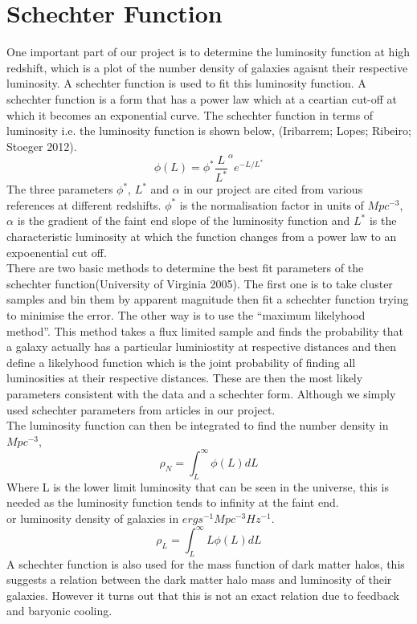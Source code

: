 \documentclass{article}
\begin{document}
\section{Schechter Function}
One important part of our project is to determine the luminosity function at high redshift, which is a plot of the number density of galaxies agaisnt their respective luminosity. A schechter function is used to fit this luminosity function. A schechter function is a form that has a power law which at a ceartian cut-off at which it becomes an exponential curve. The schechter function in terms of luminosity i.e. the luminosity function is shown below, (Iribarrem; Lopes; Ribeiro; Stoeger 2012).
\begin{equation}
\phi(L)=\phi^{*}\frac{L}{L^{*}}^{\alpha}e^{-L/L^{*}}
\end{equation}
\indent The three parameters $\phi^{*}$, $L^{*}$ and $\alpha$ in our project are cited from various references at different redshifts. $\phi^{*}$ is the normalisation factor in units of $Mpc^{-3}$, $\alpha$ is the gradient of the faint end slope of the luminosity function and $L^{*}$ is the characteristic luminosity at which the function changes from a power law to an expoenential cut off.\\
\indent There are two basic methods to determine the best fit parameters of the schechter function(University of Virginia 2005). The first one is to take cluster samples and bin them by apparent magnitude then fit a schechter function trying to minimise the error. The other way is to use the ``maximum likelyhood method''. This method takes a flux limited sample and finds the probability that a galaxy actually has a particular luminiostity at respective distances and then define a likelyhood function which is the joint probability of finding all luminosities at their respective distances. These are then the most likely parameters consistent with the data and a schechter form. Although we simply used schechter parameters from articles in our project.\\
\indent The luminosity function can then be integrated to find the number density in $Mpc^{-3}$,
\begin{equation}
\rho_{N}=\int^{\infty}_{L}\phi(L)dL
\end{equation}
Where L is the lower limit luminosity that can be seen in the universe, this is needed as the luminosity function tends to infinity at the faint end.\\
or luminosity density of galaxies in $erg s^{-1}Mpc^{-3}Hz^{-1}$.
\begin{equation}
\rho_{L}=\int^{\infty}_{L}L\phi(L)dL
\end{equation}
A schechter function is also used for the mass function of dark matter halos, this suggests a relation between the dark matter halo mass and luminosity of their galaxies. However it turns out that this is not an exact relation due to feedback and baryonic cooling.\\
\end{document}

